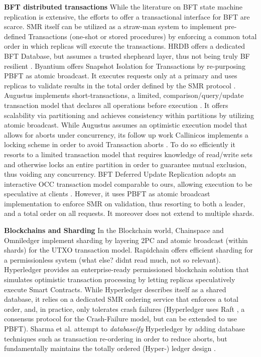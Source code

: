 \textbf{BFT distributed transactions}
While the literature on BFT state machine replication is extensive, the efforts to offer a transactional interface for BFT are scarce. SMR itself can be utilized as a straw-man system to implement pre-defined Transactions (one-shot or stored procedures) by enforcing a common total order  in which replicas will execute the transactions. 
HRDB offers a dedicated BFT Database, but assumes a trusted shepheard layer, thus not being truly BF resilient \cite{vandiver2007tolerating}.
Byantium offers Snapshot Isolation for Transactions by re-purposing PBFT as atomic broadcast. It executes requests only at a primary and uses replicas to validate results in the total order defined by the SMR protocol \cite{garcia2011efficient}. Augustus implements short-transactions, a limited, comparison/query/update transaction model that declares all operations before execution \cite{padilha2013augustus}. It offers scalability via partitioning and achieves consistency within partitions by utilizing atomic broadcast. While Augustus assumes an optimistic execution model that allows for aborts under concurrency, its follow up work Callinicos implements a locking scheme in order to avoid Transaction aborts \cite{padilha2016callinicos}. To do so efficiently it resorts to a limited transaction model that requires knowledge of read/write sets and otherwise locks an entire partition in order to guarantee mutual exclusion, thus voiding any concurrency. BFT Deferred Update Replication adopts an interactive OCC transaction model comparable to ours, allowing execution to be speculative at clients \cite{pedone2012byzantine}. However, it uses PBFT as atomic broadcast implementation to enforce SMR on validation, thus resorting to both a leader, and a total order on all requests. It moreover does not extend to multiple shards.

\textbf{Blockchains and Sharding}
In the Blockchain world, Chainspace \cite{al2017chainspace} and Omniledger \cite{kokoris2018omniledger} implement sharding by layering 2PC and atomic broadcast (within shards) for the UTXO transaction model. Rapidchain \cite{zamani2018rapidchain} offers efficient sharding for a permissionless system (what else? didnt read much, not so relevant). Hyperledger provides an enterprise-ready permissioned blockchain solution that simulates optimistic transaction processing by letting replicas speculatively execute Smart Contracts. While Hyperledger \cite{Hyperledger} describes itself as a shared database, it relies on a dedicated SMR ordering service that enforces a total order, and, in practice, only tolerates crash failures (Hyperledger uses Raft \cite{ongaro2014search}, a consensus protocol for the Crash-Failure model,  but can be extended to use PBFT). Sharma et al. attempt to \textit{databaseify} Hyperledger by adding database techniques such as transaction re-ordering in order to reduce aborts, but fundamentally maintains the totally ordered (Hyper-) ledger design \cite{sharma2018databasify}.  

